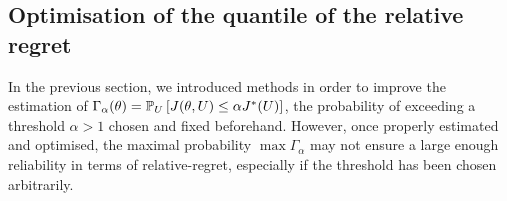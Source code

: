 \documentclass[../../Main_ManuscritThese.tex]{subfiles}
\begin{document}



\clearpage

\subsection{Optimisation of the quantile of the relative regret}
\label{sec:quantile_rr}
In the previous section, we introduced methods in order to improve the
estimation of
$\Gamma_{\alpha}(\theta)= \mathbb{P}_{U}\left[J(\theta, U) \leq \alpha
  J^*(U)\right]$, the probability of exceeding a threshold
$\alpha> 1$ chosen and fixed beforehand.
However, once properly estimated and optimised, the maximal
probability $\max \Gamma_{\alpha}$ may not ensure a large enough
reliability in terms of relative-regret, especially if the threshold
has been chosen arbitrarily.
\end{document}
